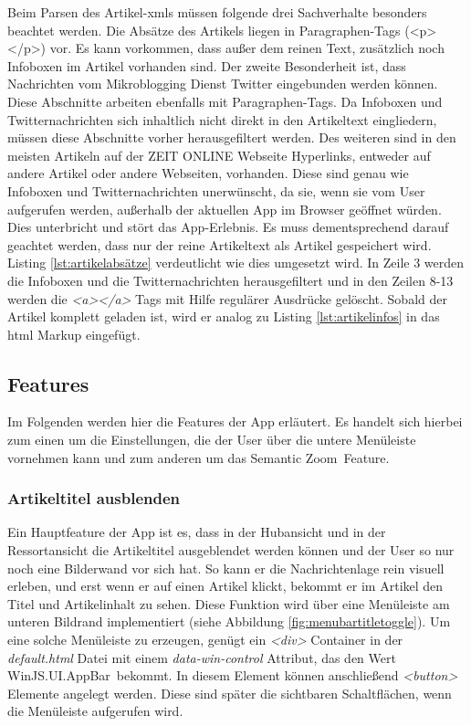 \documentclass[12pt,a4paper,bibtotoc,abstracton]{scrartcl}
\begin{document}
Beim Parsen des Artikel-\ac{xml}s müssen folgende drei Sachverhalte besonders beachtet werden. Die Absätze des Artikels liegen in Paragraphen-Tags (<p></p>) vor. Es kann vorkommen, dass außer dem reinen Text, zusätzlich noch Infoboxen im Artikel vorhanden sind. Der zweite Besonderheit ist, dass Nachrichten vom Mikroblogging Dienst Twitter eingebunden werden können. Diese Abschnitte arbeiten ebenfalls mit Paragraphen-Tags. Da Infoboxen und Twitternachrichten sich inhaltlich nicht direkt in den Artikeltext eingliedern, müssen diese Abschnitte vorher herausgefiltert werden. Des weiteren sind in den meisten Artikeln auf der ZEIT ONLINE Webseite Hyperlinks, entweder auf andere Artikel oder andere Webseiten, vorhanden. Diese sind genau wie Infoboxen und Twitternachrichten unerwünscht, da sie, wenn sie vom User aufgerufen werden, außerhalb der aktuellen App im Browser geöffnet würden. Dies unterbricht und stört das App-Erlebnis. Es muss dementsprechend darauf geachtet werden, dass nur der reine Artikeltext als Artikel gespeichert wird. Listing \ref{lst:artikelabsätze} verdeutlicht wie dies umgesetzt wird. In Zeile 3 werden die Infoboxen und die Twitternachrichten herausgefiltert und in den Zeilen 8-13 werden die \textit{<a></a>} Tags mit Hilfe regulärer Ausdrücke gelöscht. Sobald der Artikel komplett geladen ist, wird er analog zu Listing \ref{lst:artikelinfos} in das \ac{html} Markup eingefügt.

\begin{minipage}{\linewidth}
  
\end{minipage}

\subsection{Features}
\label{subsec:features}
Im Folgenden werden hier die Features der App erläutert. Es handelt sich hierbei zum einen um die Einstellungen, die der User über die untere Menüleiste vornehmen kann und zum anderen um das \glqq Semantic Zoom\grqq\ Feature.

\subsubsection{Artikeltitel ausblenden}
\label{subsubsec:artikeltitelausblenden}
Ein Hauptfeature der App ist es, dass in der Hubansicht und in der Ressortansicht die Artikeltitel ausgeblendet werden können und der User so nur noch eine Bilderwand vor sich hat. So kann er die Nachrichtenlage rein visuell erleben, und erst wenn er auf einen Artikel klickt, bekommt er im Artikel den Titel und Artikelinhalt zu sehen. Diese Funktion wird über eine Menüleiste am unteren Bildrand implementiert (siehe Abbildung \ref{fig:menubartitletoggle}). Um eine solche Menüleiste zu erzeugen, genügt ein \textit{<div>} Container in der \textit{default.html} Datei mit einem \textit{data-win-control} Attribut, das den Wert \glqq WinJS.UI.AppBar\grqq\ bekommt. In diesem Element können anschließend \textit{<button>} Elemente angelegt werden. Diese sind später die sichtbaren Schaltflächen, wenn die Menüleiste aufgerufen wird.
\end{document}
